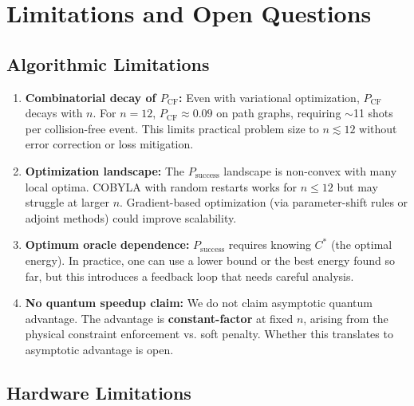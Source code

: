 \section{Limitations and Open Questions}
\label{sec:limitations}

\subsection{Algorithmic Limitations}

\begin{enumerate}
\item \textbf{Combinatorial decay of $P_{\mathrm{CF}}$:} Even with variational optimization, $P_{\mathrm{CF}}$ decays with $n$. For $n=12$, $P_{\mathrm{CF}} \approx 0.09$ on path graphs, requiring $\sim$11 shots per collision-free event. This limits practical problem size to $n \lesssim 12$ without error correction or loss mitigation.
\item \textbf{Optimization landscape:} The $P_{\mathrm{success}}$ landscape is non-convex with many local optima. COBYLA with random restarts works for $n \le 12$ but may struggle at larger $n$. Gradient-based optimization (via parameter-shift rules or adjoint methods) could improve scalability.
\item \textbf{Optimum oracle dependence:} $P_{\mathrm{success}}$ requires knowing $C^*$ (the optimal energy). In practice, one can use a lower bound or the best energy found so far, but this introduces a feedback loop that needs careful analysis.
\item \textbf{No quantum speedup claim:} We do not claim asymptotic quantum advantage. The advantage is \textbf{constant-factor} at fixed $n$, arising from the physical constraint enforcement vs. soft penalty. Whether this translates to asymptotic advantage is open.
\end{enumerate}

\subsection{Hardware Limitations}

